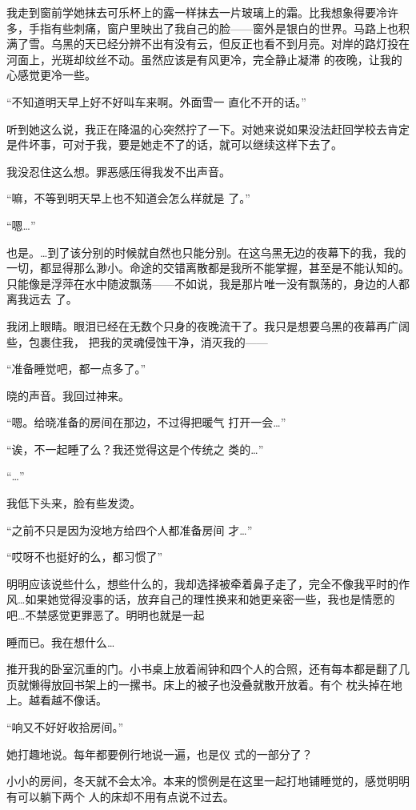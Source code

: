\documentclass{article}
\begin{document}
我走到窗前学她抹去可乐杯上的露一样抹去一片玻璃上的霜。比我想象得要冷许多，手指有些刺痛，窗户里映出了我自己的脸——窗外是银白的世界。马路上也积满了雪。乌黑的天已经分辨不出有没有云，但反正也看不到月亮。对岸的路灯投在河面上，光斑却纹丝不动。虽然应该是有风更冷，完全静止凝滞
的夜晚，让我的心感觉更冷一些。 

“不知道明天早上好不好叫车来啊。外面雪一
直化不开的话。” 

听到她这么说，我正在降温的心突然拧了一下。对她来说如果没法赶回学校去肯定是件坏事，可对于我，要是她走不了的话，就可以继续这样下去了。

\newpage
我没忍住这么想。罪恶感压得我发不出声音。 

“嘛，不等到明天早上也不知道会怎么样就是
了。” 


“嗯…” 

也是。…到了该分别的时候就自然也只能分别。在这乌黑无边的夜幕下的我，我的一切，都显得那么渺小。命途的交错离散都是我所不能掌握，甚至是不能认知的。只能像是浮萍在水中随波飘荡——不如说，我是那片唯一没有飘荡的，身边的人都离我远去
了。 

我闭上眼睛。眼泪已经在无数个只身的夜晚流干了。我只是想要乌黑的夜幕再广阔些，包裹住我，
把我的灵魂侵蚀干净，消灭我的—— 


“准备睡觉吧，都一点多了。” 


晓的声音。我回过神来。 

\newpage

“嗯。给晓准备的房间在那边，不过得把暖气
打开一会…” 

“诶，不一起睡了么？我还觉得这是个传统之
类的…” 


“…” 


我低下头来，脸有些发烫。 

“之前不只是因为没地方给四个人都准备房间
才…” 


“哎呀不也挺好的么，都习惯了” 


明明应该说些什么，想些什么的，我却选择被牵着鼻子走了，完全不像我平时的作风…如果她觉得没事的话，放弃自己的理性换来和她更亲密一些，我也是情愿的吧…不禁感觉更罪恶了。明明也就是一起

\newpage
睡而已。我在想什么… 

推开我的卧室沉重的门。小书桌上放着闹钟和四个人的合照，还有每本都是翻了几页就懒得放回书架上的一摞书。床上的被子也没叠就散开放着。有个
枕头掉在地上。越看越不像话。 


“响又不好好收拾房间。” 

她打趣地说。每年都要例行地说一遍，也是仪
式的一部分了？ 

小小的房间，冬天就不会太冷。本来的惯例是在这里一起打地铺睡觉的，感觉明明有可以躺下两个
人的床却不用有点说不过去。 
\end{document}
